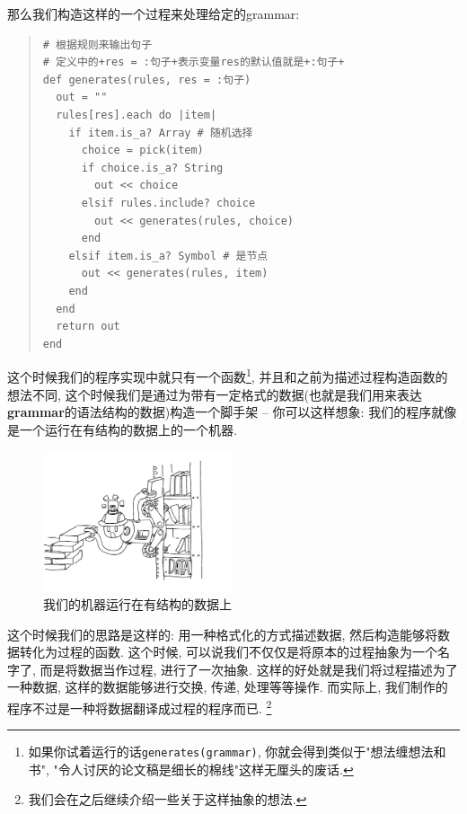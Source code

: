 \begin{example}
  那么我们构造这样的一个过程来处理给定的grammar: 

  \begin{quotation}
    \begin{verbatim}
# 根据规则来输出句子
# 定义中的+res = :句子+表示变量res的默认值就是+:句子+
def generates(rules, res = :句子)
  out = ""
  rules[res].each do |item|
    if item.is_a? Array # 随机选择
      choice = pick(item)
      if choice.is_a? String
        out << choice
      elsif rules.include? choice
        out << generates(rules, choice)
      end
    elsif item.is_a? Symbol # 是节点
      out << generates(rules, item)
    end
  end
  return out
end
    \end{verbatim}
  \end{quotation}

  这个时候我们的程序实现中就只有一个函数\footnote{如果你试着运行的话\texttt{generates(grammar)}, 你就会得到类似于"想法缠想法和书", "令人讨厌的论文稿是细长的棉线"这样无厘头的废话. }, 并且和之前为描述过程构造函数的想法不同, 这个时候我们是通过为带有一定格式的数据(也就是我们用来表达\textbf{grammar}的语法结构的数据)构造一个脚手架 -- 你可以这样想象: 我们的程序就像是一个运行在有结构的数据上的一个机器. 

  \begin{figure}[h]
    \centering
    \includegraphics[width=0.5\textwidth]{image/chapter/1_language/operate_on_data.jpg}
    \caption{我们的机器运行在有结构的数据上}
  \end{figure}


  这个时候我们的思路是这样的: 用一种格式化的方式描述数据, 然后构造能够将数据转化为过程的函数. 这个时候, 可以说我们不仅仅是将原本的过程抽象为一个名字了, 而是将数据当作过程, 进行了一次抽象. 这样的好处就是我们将过程描述为了一种数据, 这样的数据能够进行交换, 传递, 处理等等操作. 而实际上, 我们制作的程序不过是一种将数据翻译成过程的程序而已. \footnote{我们会在之后继续介绍一些关于这样抽象的想法. }


\end{example}

